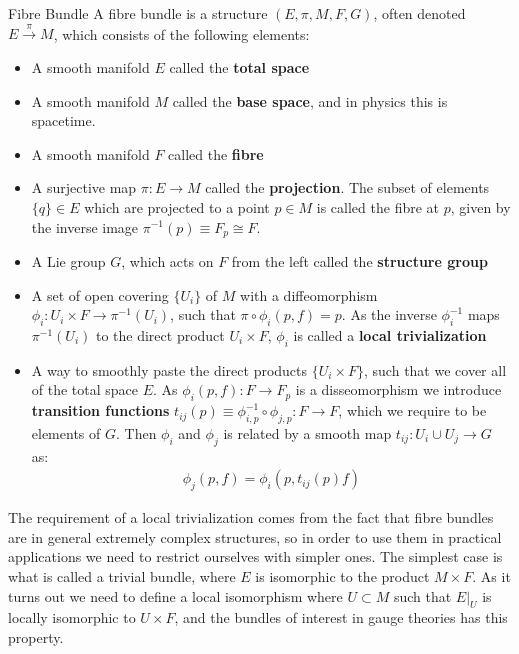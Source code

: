 \begin{mydef}{Fibre Bundle}{}
A fibre bundle is a structure $(E,\pi,M,F,G)$, often denoted $E\overset{\pi}{\longrightarrow} M$, which consists of the following elements:
\begin{itemize}
    \item A smooth manifold $E$ called the \textbf{total space}
    \item A smooth manifold $M$ called the \textbf{base space}, and in physics this is spacetime.
    \item A smooth manifold $F$ called the \textbf{fibre}
    \item A surjective map $\pi:E\rightarrow M$ called the \textbf{projection}. The subset of elements $\{q\}\in E$ which are projected to a point $p\in M$ is called the fibre at $p$, given by the inverse image $\pi^{-1}(p)\equiv F_{p}\cong F$.
    \item A Lie group $G$, which acts on $F$ from the left called the \textbf{structure group}
    \item A set of open covering $\{U_{i}\}$ of $M$ with a diffeomorphism $\phi_{i}:U_{i}\times F\rightarrow \pi^{-1}(U_{i})$, such that $\pi\circ\phi_{i}(p,f)=p$. As the inverse $\phi_{i}^{-1}$ maps $\pi^{-1}(U_{i})$ to the direct product $U_{i}\times F$, $\phi_{i}$ is called a \textbf{local trivialization}
    \item A way to smoothly paste the direct products $\{U_{i}\times F\}$, such that we cover all of the total space $E$. As $\phi_{i}(p,f):F\rightarrow F_{p}$ is a disseomorphism we introduce \textbf{transition functions} $t_{ij}(p)\equiv \phi_{i,p}^{-1}\circ\phi_{j,p}:F\rightarrow F$, which we require to be elements of $G$. Then $\phi_{i}$ and $\phi_{j}$ is related by a smooth map $t_{ij}:U_{i}\cup U_{j}\rightarrow G$ as:
    \begin{align}
        \phi_{j}(p,f)=\phi_{i}(p,t_{ij}(p)f)
    \end{align}
\end{itemize}
\end{mydef}\noindent
The requirement of a local trivialization comes from the fact that fibre bundles are in general extremely complex structures, so in order to use them in practical applications we need to restrict ourselves with simpler ones. The simplest case is what is called a trivial bundle, where $E$ is isomorphic to the product $M\times F$. As it turns out we need to define a local isomorphism where $U\subset M$ such that $E|_{U}$ is locally isomorphic to $U\times F$, and the bundles of interest in gauge theories has this property. 

